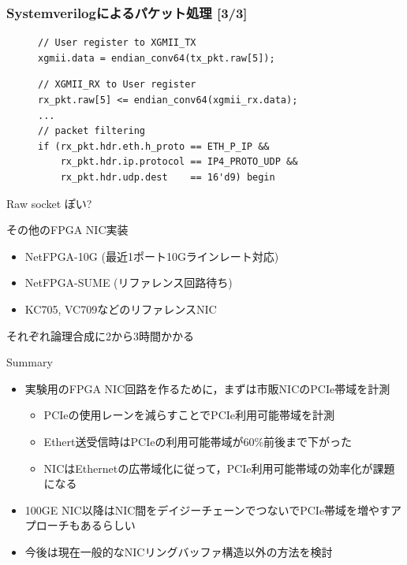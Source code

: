 \documentclass[10pt, compress]{beamer}
\begin{document}
\begin{frame}[fragile,t]
  \frametitle{Systemverilogによるパケット処理 [3/3]}

\vspace{-1em}

\begin{figure}
\begin{tcolorbox}[title=TX]
\begin{verbatim}
// User register to XGMII_TX
xgmii.data = endian_conv64(tx_pkt.raw[5]);
\end{verbatim}
\end{tcolorbox}
%
\begin{tcolorbox}[title=RX]
\begin{verbatim}
// XGMII_RX to User register
rx_pkt.raw[5] <= endian_conv64(xgmii_rx.data);
...
// packet filtering
if (rx_pkt.hdr.eth.h_proto == ETH_P_IP &&
    rx_pkt.hdr.ip.protocol == IP4_PROTO_UDP &&
    rx_pkt.hdr.udp.dest    == 16'd9) begin
\end{verbatim}
\end{tcolorbox}
\end{figure}
\vspace{-.5em}
Raw socket ぽい?
\end{frame}


\begin{frame}[fragile,t]{その他のFPGA NIC実装}
\begin{itemize}
	\item NetFPGA-10G (最近1ポート10Gラインレート対応)
	\item NetFPGA-SUME (リファレンス回路待ち)
	\item KC705, VC709などのリファレンスNIC
\end{itemize}
それぞれ論理合成に2から3時間かかる\faMeh
\end{frame}


\begin{frame}{Summary}

\begin{itemize}
	\item 実験用のFPGA NIC回路を作るために，まずは市販NICのPCIe帯域を計測
	\begin{itemize}
		\item PCIeの使用レーンを減らすことでPCIe利用可能帯域を計測
		\item Ethert送受信時はPCIeの利用可能帯域が60\%前後まで下がった
		\item NICはEthernetの広帯域化に従って，PCIe利用可能帯域の効率化が課題になる
	\end{itemize}
	\item 100GE NIC以降はNIC間をデイジーチェーンでつないでPCIe帯域を増やすアプローチもあるらしい
	\item 今後は現在一般的なNICリングバッファ構造以外の方法を検討
\end{itemize}
\end{frame}

\end{document}
